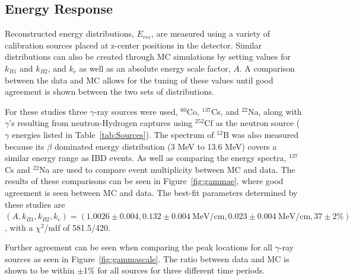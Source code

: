 \subsection{Energy Response}

Reconstructed energy distributions, $E_{rec}$, are measured using a variety of calibration sources placed at z-center positions in the detector. 
Similar distributions can also be created through MC simulations by setting values for $k_{B1}$ and $k_{B2}$, and $k_c$ as well as an absolute energy scale factor, $A$.
A comparison between the data and MC allows for the tuning of these values until good agreement is shown between the two sets of distributions.

For these studies three $\gamma$-ray sources were used, $^{60}$Co, $^{137}$Cs, and $^{22}$Na, along with $\gamma$'s resulting from neutron-Hydrogen captures using $^{252}$Cf as the neutron source ($\gamma$ energies listed in Table~\ref{tab:Sources}).
The spectrum of $^{12}$B was also measured because its $\beta$ dominated energy distribution  (3 MeV to 13.6 MeV) covers a similar energy range as IBD events.
As well as comparing the energy spectra, $^{137}$Cs and $^{22}$Na are used to compare event multiplicity between MC and data.
The results of these comparisons can be seen in Figure~\ref{fig:gammae}, where good agreement is seen between MC and data.
The best-fit parameters determined by these studies are $(A,k_{B1},k_{B2},k_c) = (1.0026\pm0.004,0.132\pm0.004 ~\textrm{MeV/cm}, 0.023\pm0.004~\textrm{MeV/cm}, 37\pm2\%)$, with a $\chi^2$/ndf of 581.5/420.

Further agreement can be seen when comparing the peak locations for all $\gamma$-ray sources as seen in Figure~\ref{fig:gammascale}. The ratio between data and MC is shown to be within $\pm$1\% for all sources for three different time periods.

